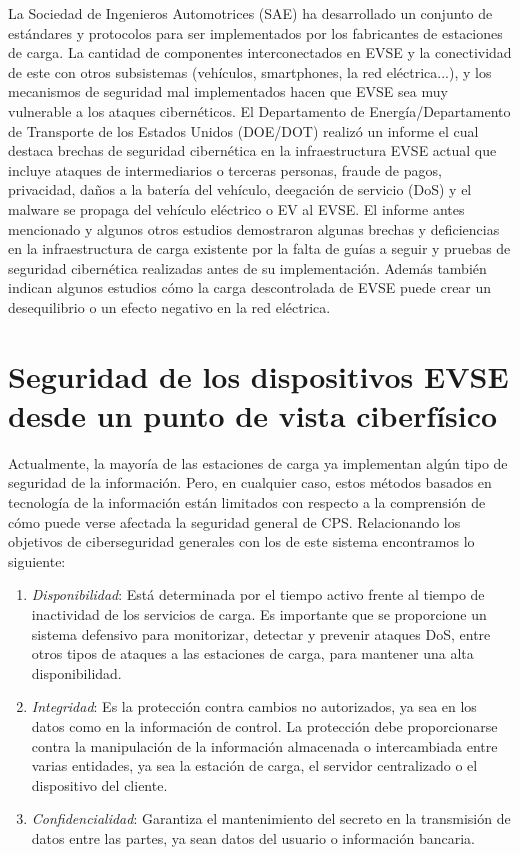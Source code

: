 \documentclass[12pt,a4paper,onecolumn,oneside]{report}
\begin{document}
La Sociedad de Ingenieros Automotrices (SAE) ha desarrollado un conjunto de estándares y protocolos para ser implementados por los fabricantes de estaciones de carga. La cantidad de componentes interconectados en EVSE y la conectividad de este con otros subsistemas (vehículos, smartphones, la red eléctrica...), y los mecanismos de seguridad mal implementados hacen que EVSE sea muy vulnerable a los ataques cibernéticos. El Departamento de Energía/Departamento de Transporte de los Estados Unidos (DOE/DOT) realizó un informe el cual destaca brechas de seguridad cibernética en la infraestructura EVSE actual que incluye ataques de intermediarios o terceras personas, fraude de pagos, privacidad, daños a la batería del vehículo, deegación de servicio (DoS) y el malware se propaga del vehículo eléctrico o EV al EVSE. El informe antes mencionado y algunos otros estudios \cite{once}\cite{doce}\cite{trece} demostraron algunas brechas y deficiencias en la infraestructura de carga existente por la falta de guías a seguir y pruebas de seguridad cibernética realizadas antes de su implementación. Además también indican algunos estudios cómo la carga descontrolada de EVSE puede crear un desequilibrio o un efecto negativo en la red eléctrica.


\section{Seguridad de los dispositivos EVSE desde un punto de vista ciberfísico}
\label{Seguridad de los dispositivos EVSE desde un punto de vista ciberfísico}

Actualmente, la mayoría de las estaciones de carga ya implementan algún tipo de seguridad de la información. Pero, en cualquier caso, estos métodos basados en tecnología de la información están limitados con respecto a la comprensión de cómo puede verse afectada la seguridad general de CPS. Relacionando los objetivos de ciberseguridad generales con los de este sistema encontramos lo siguiente:


\begin{enumerate}

\item \textit{Disponibilidad}: Está determinada por el tiempo activo frente al tiempo de inactividad de los servicios de carga. Es importante que se proporcione un sistema defensivo para monitorizar, detectar y prevenir ataques DoS, entre otros tipos de ataques a las estaciones de carga, para mantener una alta disponibilidad.
\item \textit{Integridad}: Es la protección contra cambios no autorizados, ya sea en los datos como en la información de control. La protección debe proporcionarse contra la manipulación de la información almacenada o intercambiada entre varias entidades, ya sea la estación de carga, el servidor centralizado o el dispositivo del cliente. 
\item \textit{Confidencialidad}: Garantiza el mantenimiento del secreto en la transmisión de datos entre las partes, ya sean datos del usuario o información bancaria.

\end{enumerate}
\end{document}
